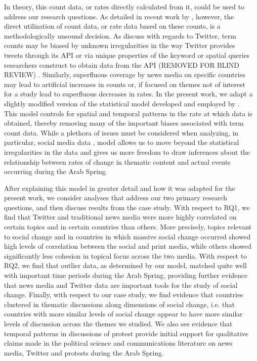 In theory, this count data, or rates directly calculated from it, could be used to address our research questions.   As detailed in recent work by \cite{eisenstein_diffusion_2014}, however, the direct utilization of count data, or rate data based on these counts, is a methodologically unsound decision. As \cite{eisenstein_diffusion_2014} discuss with regards to Twitter, term counts may be biased by unknown irregularities in the way Twitter provides tweets through its API \citep{morstatter_is_2013} or via unique properties of the keyword or spatial queries researchers construct to obtain data from the API (REMOVED FOR BLIND REVIEW)%
. Similarly, superfluous coverage by news media on specific countries may lead to artificial increases in counts or, if focused on themes not of interest for a study lead to superfluous decreases in rates.  In the present work, we adapt a slightly modified version of the statistical model developed and employed by \cite{eisenstein_diffusion_2014}. This model controls for spatial and temporal patterns in the rate at which data is obtained, thereby removing many of the important biases associated with term count data. While a plethora of issues must be considered when analyzing, in particular, social media data \citep{tufekci_big_2014},  model allows us to move beyond the statistical irregularities in the data and gives us more freedom to draw inferences about the relationship between rates of change in thematic content and actual events occurring during the Arab Spring.

After explaining this model in greater detail and how it was adapted for the present work, we consider analyses that address our two primary research questions, and then discuss results from the case study.  With respect to RQ1, we find that Twitter and traditional news media were more highly correlated on certain topics and in certain countries than others. More precisely, topics relevant to social change and in countries in which massive social change occurred showed high levels of correlation between the social and print media, while others showed significantly less cohesion in topical focus across the two media. With respect to RQ2, we find that outlier data, as determined by our model, matched quite well with important time periods during the Arab Spring, providing further evidence that news media and Twitter data are important tools for the study of social change. Finally, with respect to our case study, we find evidence that countries clustered in thematic discussions along dimensions of social change, i.e. that countries with more similar levels of social change appear to have more similar levels of discussion across the themes we studied. We also see evidence that temporal patterns in discussions of protest provide initial support for qualitative claims made in the political science and communications literature on news media, Twitter and protests during the Arab Spring.

